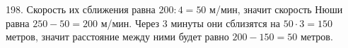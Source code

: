 198. Скорость их сближения равна $200:4=50$ м/мин, значит скорость Нюши равна $250-50=200$ м/мин. Через 3 минуты они сблизятся на $50\cdot3=150$ метров, значит расстояние между ними будет равно $200-150=50$ метров.\\
